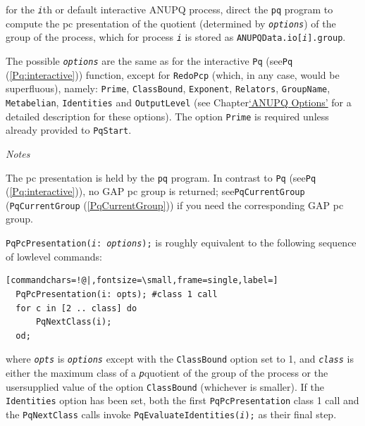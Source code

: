 \documentclass[a4paper,11pt]{report}
\begin{document}
{{{ for the \mbox{\texttt{\mdseries\slshape i}}th or default interactive \textsf{ANUPQ} process, direct the \texttt{pq} program to compute the pc presentation of the quotient (determined by \mbox{\texttt{\mdseries\slshape options}}) of the group of the process, which for process \mbox{\texttt{\mdseries\slshape i}} is stored as \texttt{ANUPQData.io[\mbox{\texttt{\mdseries\slshape i}}].group}. 

 The possible \mbox{\texttt{\mdseries\slshape options}} are the same as for the interactive \texttt{Pq} (see{\nobreakspace}\texttt{Pq} (\ref{Pq:interactive})) function, except for \texttt{RedoPcp} (which, in any case, would be superfluous), namely: \texttt{Prime}, \texttt{ClassBound}, \texttt{Exponent}, \texttt{Relators}, \texttt{GroupName}, \texttt{Metabelian}, \texttt{Identities} and \texttt{OutputLevel} (see Chapter{\nobreakspace}\hyperref[ANUPQ Options]{`ANUPQ Options'} for a detailed description for these options). The option \texttt{Prime} is required unless already provided to \texttt{PqStart}. 

 \emph{Notes} 

 The pc presentation is held by the \texttt{pq} program. In contrast to \texttt{Pq} (see{\nobreakspace}\texttt{Pq} (\ref{Pq:interactive})), no \textsf{GAP} pc group is returned; see{\nobreakspace}\texttt{PqCurrentGroup} (\texttt{PqCurrentGroup} (\ref{PqCurrentGroup})) if you need the corresponding \textsf{GAP} pc group. 

 \texttt{PqPcPresentation(\mbox{\texttt{\mdseries\slshape i}}: \mbox{\texttt{\mdseries\slshape options}});} is roughly equivalent to the following sequence of
low\texttt{}level commands: 

 
\begin{Verbatim}[commandchars=!@|,fontsize=\small,frame=single,label=]
  PqPcPresentation(i: opts); #class 1 call
  for c in [2 .. class] do
      PqNextClass(i);
  od;
\end{Verbatim}
 where \mbox{\texttt{\mdseries\slshape opts}} is \mbox{\texttt{\mdseries\slshape options}} except with the \texttt{ClassBound} option set to 1, and \mbox{\texttt{\mdseries\slshape class}} is either the maximum class of a \mbox{\texttt{\mdseries\slshape p}}\texttt{}quotient of the group of the process or the
user\texttt{}supplied value of the option \texttt{ClassBound} (whichever is smaller). If the \texttt{Identities} option has been set, both the first \texttt{PqPcPresentation} class 1 call and the \texttt{PqNextClass} calls invoke \texttt{PqEvaluateIdentities(\mbox{\texttt{\mdseries\slshape i}});} as their final step. 

}}}
\end{document}
